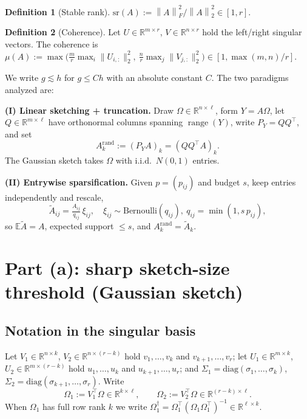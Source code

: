 \documentclass{amsart}
\theoremstyle{definition}
\newtheorem{definition}{Definition}
\DeclareMathOperator{\range}{range}
\newcommand{\R}{\mathbb{R}}
\newcommand{\Frob}[1]{\left\lVert #1\right\rVert_F}
\newcommand{\Op}[1]{\left\lVert #1\right\rVert_2}
\newcommand{\Atil}{\widetilde{A}}
\newcommand{\E}{\mathbb{E}}
\begin{document}
\begin{definition}[Stable rank]\label{def:srank}
$\mathrm{sr}(A):=\Frob{A}^2/\Op{A}^2\in[1,r]$.
\end{definition}
\begin{definition}[Coherence]\label{def:coh}
Let $U\in\R^{m\times r}$, $V\in\R^{n\times r}$ hold the left/right singular
vectors. The coherence is
$\mu(A):=\max\big(\tfrac{m}{r}\max_i\|U_{i,:}\|_2^2,\
\tfrac{n}{r}\max_j\|V_{j,:}\|_2^2\big)\in[1,\max(m,n)/r]$.
\end{definition}

We write $g\lesssim h$ for $g\le Ch$ with an absolute constant $C$. The two
paradigms analyzed are:

\smallskip
\noindent\textbf{(I) Linear sketching + truncation.} Draw
$\Omega\in\R^{n\times\ell}$, form $Y=A\Omega$, let $Q\in\R^{m\times\ell}$ have
orthonormal columns spanning $\range(Y)$, write $P_Y=QQ^\top$, and set
\begin{equation}\label{eq:rand}
A_k^{\mathrm{rand}}:=(P_YA)_k=(QQ^\top A)_k .
\end{equation}
The Gaussian sketch takes $\Omega$ with i.i.d.\ $N(0,1)$ entries.

\smallskip
\noindent\textbf{(II) Entrywise sparsification.} Given $p=(p_{ij})$ and budget
$s$, keep entries independently and rescale,
\begin{equation}\label{eq:entrywise}
\Atil_{ij}=\tfrac{A_{ij}}{q_{ij}}\,\xi_{ij},\quad
\xi_{ij}\sim\mathrm{Bernoulli}(q_{ij}),\ q_{ij}=\min(1,s\,p_{ij}),
\end{equation}
so $\E\Atil=A$, expected support $\le s$, and $A_k^{\mathrm{rand}}=\Atil_k$.

\section{Part (a): sharp sketch-size threshold (Gaussian sketch)}

\subsection{Notation in the singular basis}
Let $V_1\in\R^{n\times k}$, $V_2\in\R^{n\times(r-k)}$ hold $v_1,\dots,v_k$ and
$v_{k+1},\dots,v_r$; let $U_1\in\R^{m\times k}$, $U_2\in\R^{m\times(r-k)}$ hold
$u_1,\dots,u_k$ and $u_{k+1},\dots,u_r$; and
$\Sigma_1=\mathrm{diag}(\sigma_1,\dots,\sigma_k)$,
$\Sigma_2=\mathrm{diag}(\sigma_{k+1},\dots,\sigma_r)$. Write
\begin{equation}\label{eq:OmBlocks}
\Omega_1:=V_1^\top\Omega\in\R^{k\times\ell},\qquad
\Omega_2:=V_2^\top\Omega\in\R^{(r-k)\times\ell}.
\end{equation}
When $\Omega_1$ has full row rank $k$ we write
$\Omega_1^{\dagger}=\Omega_1^\top(\Omega_1\Omega_1^\top)^{-1}\in\R^{\ell\times k}$.
\end{document}
